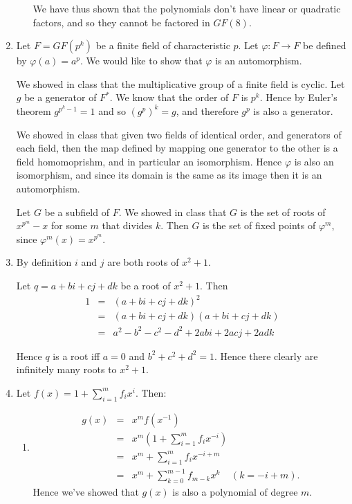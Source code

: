 \documentclass[11pt]{article} \usepackage{amssymb}
\renewcommand{\phi}{\varphi}
\begin{document}
\begin{enumerate}
\begin{enumerate}
    We have thus shown that the polynomials don't have linear or quadratic 
    factors, and so they cannot be factored in $GF(8)$.
  \end{enumerate}
\item

  Let $F=GF(p^k)$ be a finite field of characteristic $p$. 
  Let $\phi:F\to F$ be defined
  by $\phi(a)=a^p$. We would like to show that $\phi$ is an automorphism. 


  We showed in class that the multiplicative group of a 
  finite field is cyclic. Let $g$ be a generator of $F^*$.
  We know that the order of $F$ is $p^k$. 
  Hence by Euler's theorem $g^{p^k-1}=1$ and so $\left(g^p\right)^k=g$, and 
  therefore $g^p$ is also a generator. 

  We showed in class that given two fields of identical order, and generators
  of each field, then the map defined by mapping one generator to the
  other is a field homomoprishm, and in particular an isomorphism. 
  Hence $\phi$ is also an isomorphism, and since
  its domain is the same as its image then it is an automorphism.

  Let $G$ be a subfield of $F$. We showed in class that $G$ is the set of
  roots of $x^{p^m}-x$ for some $m$ that divides $k$. Then $G$ is the set of
  fixed points of $\phi^m$, since $\phi^m(x)=x^{p^m}$.

\item

  By definition $i$ and $j$ are both roots of $x^2+1$. 

  Let $q=a+bi+cj+dk$ be a root of $x^2+1$. Then
  \begin{eqnarray*}
    1 &=&(a+bi+cj+dk)^2
    \\ &=&(a+bi+cj+dk)(a+bi+cj+dk)
    \\ &=&a^2-b^2-c^2-d^2+2abi+2acj+2adk
  \end{eqnarray*}

  Hence $q$ is a root iff $a=0$ and $b^2+c^2+d^2=1$. Hence there clearly are
  infinitely many roots to $x^2+1$.

\item
  Let $f(x)=1+\sum_{i=1}^mf_ix^i$. Then:
  \begin{enumerate}
  \item 
    \begin{eqnarray*}
      g(x)&=&x^mf(x^{-1})
      \\ &=& x^m\left(1+\sum_{i=1}^mf_ix^{-i}\right)
      \\ &=& x^m+\sum_{i=1}^mf_ix^{-i+m}
      \\ &=& x^m+\sum_{k=0}^{m-1}f_{m-k}x^k \;\;\;\; (k=-i+m).
    \end{eqnarray*}
    Hence we've showed that $g(x)$ is also a polynomial of degree $m$.


\end{enumerate}
\end{enumerate}
\end{document}
